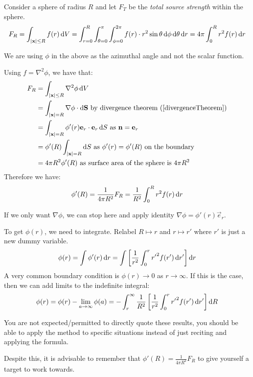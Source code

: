 \documentclass[../main.tex]{subfiles}
\begin{document}
Consider a sphere of radius $R$ and let $F_T$ be the \textit{total source strength} within the sphere.
\[
  F_R = \int_{|\vec{x}| \leq R} f(r) \d{V} = \int_{r = 0}^{R} \int_{\theta = 0}^{\pi} \int_{\phi = 0}^{2\pi} f(r) \cdot r^2 \sin \theta \d{\phi} \d{\theta} \d{r} = 4\pi \int_{0}^{R} r^2 f(r) \d{r}
\]
\begin{remark}[Notation]
  We are using $\phi$ in the above as the azimuthal angle and not the scalar function.
\end{remark}
Using $f = \nabla^2 \phi$, we have that:
\begin{align*}
  F_R &= \int_{|\vec{x}| \leq R} \nabla^2 \phi \d{V} \\
      &= \int_{|\vec{x}| = R} \nabla \phi \cdot \d{\vec{S}} \text{ by divergence theorem (\cref{divergenceTheorem})}\\
      &= \int_{|\vec{x}| = R} \phi'(r) \vec{e}_r \cdot \vec{e}_r \d{S} \text{ as $\vec{n} = \vec{e}_r$} \\
      &= \phi'(R) \int_{|\vec{x}| = R} \d{S} \text{ as $\phi'(r) = \phi'(R)$ on the boundary} \\
      &= 4\pi R^2 \phi'(R) \text{ as surface area of the sphere is $4\pi R^2$}
\end{align*}
Therefore we have:
\[
  \phi'(R) = \frac{1}{4 \pi R^2}F_R = \frac{1}{R^2} \int_{0}^{R} r^2 f(r) \d{r}
\]
\begin{remark}[Note]
  If we only want $\nabla \phi$, we can stop here and apply identity $\nabla \phi = \phi'(r) \vec{e}_r$.
\end{remark}
To get $\phi(r)$, we need to integrate.
Relabel $R \mapsto r$ and $r \mapsto r'$ where $r'$ is just a new dummy variable.
\[
  \phi(r) = \int \phi'(r) \d{r} = \int \left[\frac{1}{r^2} \int_{0}^{r} {r'}^2 f(r') \d{r'}\right] \d{r}
\]
A very common boundary condition is $\phi(r) \to 0$ as $r \to \infty$.
If this is the case, then we can add limits to the indefinite integral:
\[
  \phi(r) = \phi(r) - \lim_{a \to \infty} \phi(a) = -\int_{r}^{\infty} \frac{1}{R^2} \left[\frac{1}{r^2} \int_{0}^{r} {r'}^2 f(r') \d{r'}\right] \d{R}
\]
\begin{remark}[Exams]
  You are not expected/permitted to directly quote these results, you should be able to apply the method to specific situations instead of just reciting and applying the formula.

  Despite this, it is advisable to remember that $\phi'(R) = \frac{1}{4\pi R^2}F_R$ to give yourself a target to work towards.
\end{remark}
\end{document}
